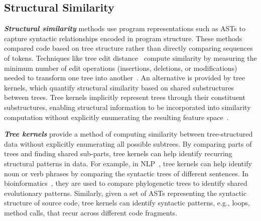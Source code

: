 \documentclass[\main/thesis.tex]{subfiles}
\begin{document}

\subsection{Structural Similarity} 
\label{sec:structural-similarity}
\textbf{\textit{Structural similarity}} methods use program representations such as ASTs to capture syntactic relationships encoded in program structure. These methods compared code based on tree structure rather than directly comparing sequences of tokens. Techniques like tree edit distance~\cite{song2024revisiting} compute similarity by measuring the minimum number of edit operations (insertions, deletions, or modifications) needed to transform one tree into another~\cite{phan2018automatically}. An alternative is provided by tree kernels, which quantify structural similarity based on shared substructures between trees. Tree kernels implicitly represent trees through their constituent substructures, enabling structural information to be incorporated into similarity computation without explicitly enumerating the resulting feature space~\cite{treekernels2001}.



\textit{\textbf{Tree kernels}} provide a method of computing similarity between tree-structured data without explicitly enumerating all possible subtrees. By comparing parts of trees and finding shared sub-parts, tree kernels can help identify recurring structural patterns in data. For example, in NLP~\cite{STKoptimal}, tree kernels can help identify noun or verb phrases by comparing the syntactic trees of different sentences. In bioinformatics~\cite{vert2002tree}, they are used to compare phylogenetic trees to identify shared evolutionary patterns. Similarly, given a set of ASTs representing the syntactic structure of source code, tree kernels can identify syntactic patterns, e.g., loops, method calls, that recur across different code fragments.
\end{document}
